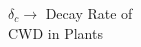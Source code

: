 \documentclass[preview]{standalone}
\begin{document}
\begin{center}
$\delta_c \rightarrow$ Decay Rate of\\CWD in Plants
\end{center}
\end{document}
